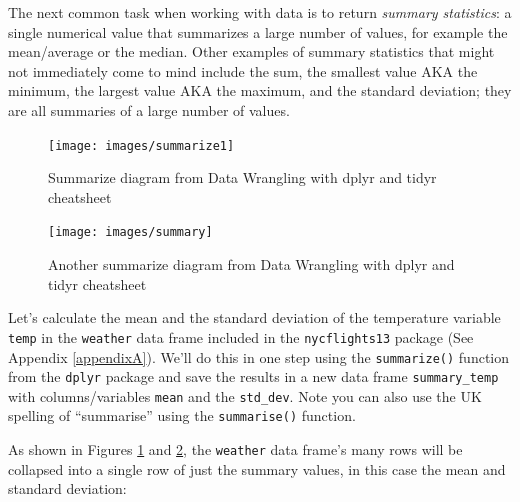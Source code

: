 \documentclass[12pt, krantz2,]{krantz}
\makeatletter
\newenvironment{Shaded}{\begin{snugshade}}{\end{snugshade}}
\newcommand{\DataTypeTok}[1]{\textcolor[rgb]{0.27,0.27,0.27}{#1}}
\newcommand{\KeywordTok}[1]{\textcolor[rgb]{0.27,0.27,0.27}{\textbf{#1}}}
\newcommand{\NormalTok}[1]{#1}
\newcommand{\OperatorTok}[1]{\textcolor[rgb]{0.43,0.43,0.43}{\textbf{#1}}}
\newcommand{\StringTok}[1]{\textcolor[rgb]{0.5,0.5,0.5}{#1}}
\newenvironment{kframe}{%
\medskip{}
\setlength{\fboxsep}{.8em}
 \def\at@end@of@kframe{}%
 \ifinner\ifhmode%
  \def\at@end@of@kframe{\end{minipage}}%
  \begin{minipage}{\columnwidth}%
 \fi\fi%
 \def\FrameCommand##1{\hskip\@totalleftmargin \hskip-\fboxsep
 \colorbox{shadecolor}{##1}\hskip-\fboxsep
     \hskip-\linewidth \hskip-\@totalleftmargin \hskip\columnwidth}%
 \MakeFramed {\advance\hsize-\width
   \@totalleftmargin\z@ \linewidth\hsize
   \@setminipage}}%
 {\par\unskip\endMakeFramed%
 \at@end@of@kframe}
\renewenvironment{Shaded}{\begin{kframe}}{\end{kframe}}
\makeatother
\begin{document}
The next common task when working with data is to return \emph{summary statistics}: a single numerical value that summarizes a large number of values, for example the mean/average or the median. Other examples of summary statistics that might not immediately come to mind include the sum, the smallest value AKA the minimum, the largest value AKA the maximum, and the standard deviation; they are all summaries of a large number of values.

\begin{figure}

{\centering \texttt{[image: images/summarize1]} 

}

\caption{Summarize diagram from Data Wrangling with dplyr and tidyr cheatsheet}\label{fig:sum1}
\end{figure}

\begin{figure}

{\centering \texttt{[image: images/summary]} 

}

\caption{Another summarize diagram from Data Wrangling with dplyr and tidyr cheatsheet}\label{fig:sum2}
\end{figure}

Let's calculate the mean and the standard deviation of the temperature variable \texttt{temp} in the \texttt{weather} data frame included in the \texttt{nycflights13} package (See Appendix \ref{appendixA}). We'll do this in one step using the \texttt{summarize()} function from the \texttt{dplyr} package and save the results in a new data frame \texttt{summary\_temp} with columns/variables \texttt{mean} and the \texttt{std\_dev}. Note you can also use the UK spelling of ``summarise'' using the \texttt{summarise()} function.

As shown in Figures \ref{fig:sum1} and \ref{fig:sum2}, the \texttt{weather} data frame's many rows will be collapsed into a single row of just the summary values, in this case the mean and standard deviation:

\begin{Shaded}
\end{Shaded}
\end{document}
